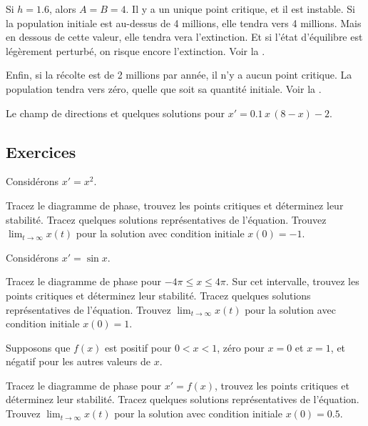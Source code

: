 Si $h = 1.6$, alors $A=B=4$.  Il y a un unique point critique, et il est instable.
Si la population initiale est au-dessus de 4 millions, elle tendra vers 4 millions.
Mais en dessous de cette valeur, elle tendra vera l'extinction.
Et si l'état d'équilibre est légèrement perturbé, on risque encore l'extinction. Voir la .

Enfin, si la récolte est de 2 millions par année, il n'y a aucun point critique.
La population tendra vers zéro, quelle que soit sa quantité initiale.  Voir la .

\begin{myfig}
	\capstart {}
	\caption{Le champ de directions et quelques solutions pour
	$x' = 0.1\,x\,(8-x)-2$.\label{2.2:harv2}}
\end{myfig}


\subsection{Exercices}

\begin{samepage}
\begin{exercise}
	Considérons $x' = x^2$.
	\begin{tasks}
		\task Tracez le diagramme de phase, trouvez les points critiques et déterminez leur stabilité.
		\task Tracez quelques solutions représentatives de l'équation.
		\task Trouvez $\displaystyle \lim_{t\to \infty} x(t)$ pour la solution avec condition initiale 	$x(0) = -1$.
	\end{tasks}
\end{exercise}
\end{samepage}

\begin{exercise}
	Considérons $x' = \sin x$.
	\begin{tasks}
		\task Tracez le diagramme de phase pour $-4\pi \leq x \leq 4\pi$.  Sur cet intervalle, trouvez les points critiques et déterminez leur stabilité.
		\task Tracez quelques solutions représentatives de l'équation.
		\task Trouvez $\displaystyle \lim_{t\to \infty} x(t)$ pour la solution avec condition initiale  $x(0) = 1$.
	\end{tasks}
\end{exercise}

\begin{exercise}
	Supposons que $f(x)$ est positif pour $0 < x < 1$, zéro pour $x=0$ et $x=1$,
	et négatif pour les autres valeurs de $x$.
	\begin{tasks}
		\task Tracez le diagramme de phase pour $x' = f(x)$, trouvez les points critiques et déterminez leur stabilité.
		\task Tracez quelques solutions représentatives de l'équation.
		\task Trouvez $\displaystyle \lim_{t\to \infty} x(t)$ pour la solution avec condition initiale $x(0) = 0.5$.
	\end{tasks}
\end{exercise}

